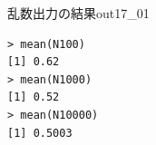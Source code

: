 \begin{Rscreen}{乱数出力の結果}{out17_01}
	\begin{verbatim}
> mean(N100)
[1] 0.62
> mean(N1000)
[1] 0.52
> mean(N10000)
[1] 0.5003\end{verbatim}
\end{Rscreen}
